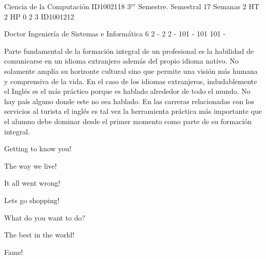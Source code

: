 \documentclass[a4paper,8pt]{article}
\begin{document}
\setNombreProfesor{}
\setGradoProfesorAbreviado{}
\sylabusHeader

\academicaTable
{Ciencia de la Computación} %
{ID1002118} %
{3$^{er}$ Semestre.} %
{Semestral} %
{17 Semanas} %
{2 HT} %
{2 HP} %
{0} %
{}  %
{2} %
{3} %
{ID1001212} %

\administrativaTable
{Doctor} %
{Ingeniería de Sistemas e Informática} %
{6} %
{2} %
{-} %
{2} %
{2} %
{-} %
{101} %
{-} %
{101} %
{101} %
{-} %


\begin{fundamentacion}
Parte fundamental de la formación integral de un profesional es la habilidad de comunicarse en un idioma extranjero además del propio idioma nativo. No solamente amplía su horizonte cultural sino que permite una visión más humana y comprensiva de la vida. En el caso de los idiomas extranjeros, indudablemente el Inglés es el 
más práctico porque es hablado alrededor de todo el mundo. No hay país alguno donde este no sea hablado. En las carreras relacionadas con los servicios al turista el inglés es tal vez la herramienta práctica más importante que el alumno debe dominar desde el primer momento como parte de su formación integral.

\end{fundamentacion}

\begin{sumilla}
\item Getting to know you!
\item The way we live!
\item It all went wrong!
\item Lets go shopping!
\item What do you want to do?
\item The best in the world!
\item Fame!

\end{sumilla}
\end{document}
